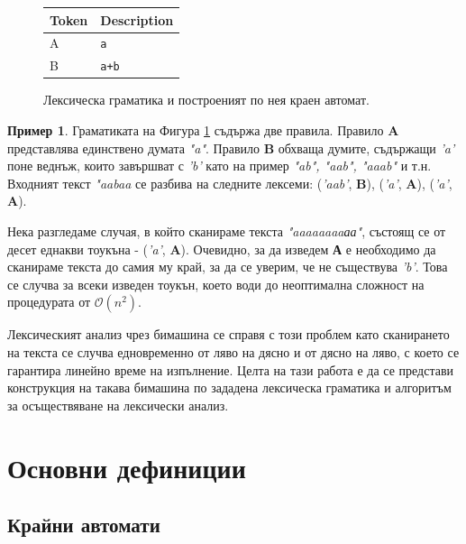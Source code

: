 \documentclass[12pt, oneside]{article}
\theoremstyle{definition}
\newtheorem{example}{Пример}[section]
\begin{document}
\begin{figure}[!htb]
	\begin{center}
		\begin{tabular}{ |l|l| } 
		\hline
		Token & Description \\
		\hline
		A & \verb/а/ \\
		B & \verb/a+b/ \\
		\hline
		\end{tabular}
	\end{center}
	\centering
	\begingroup
		
	\endgroup
	\label{fig:Lexgr2}
	\caption{Лексическа граматика и построеният по нея краен автомат.}
\end{figure}

\begin{example}
	Граматиката на Фигура \ref{fig:Lexgr2} съдържа две правила. Правило \textbf{A} представлява единствено думата \emph{"a"}. Правило \textbf{B} обхваща думите, съдържащи \emph{'a'} поне веднъж, които завършват с \emph{'b'} като на пример \emph{"ab", "aab", "aaab"} и т.н. Входният текст \emph{"aabaa} се разбива на следните лексеми: (\emph{'aab'}, \textbf{B}), (\emph{'a'}, \textbf{A}), (\emph{'a'}, \textbf{A}).

	Нека разгледаме случая, в който сканираме текста \emph{"aaaaaaaaаа"}, състоящ се от десет еднакви тоукъна - (\emph{'a'}, \textbf{A}). Очевидно, за да изведем \textbf{А} е необходимо да сканираме текста до самия му край, за да се уверим, че не съществува \emph{'b'}. Това се случва за всеки изведен тоукън, което води до неоптимална сложност на процедурата от \( \mathcal{O}(n^2) \).
\end{example}

Лексическият анализ чрез бимашина се справя с този проблем като сканирането на текста се случва едновременно от ляво на дясно и от дясно на ляво, с което се гарантира линейно време на изпълнение. Целта на тази работа е да се представи конструкция на такава бимашина по зададена лексическа граматика и алгоритъм за осъществяване на лексически анализ.

\pagebreak
\section{Основни дефиниции}

\subsection{Крайни автомати}
\end{document}
